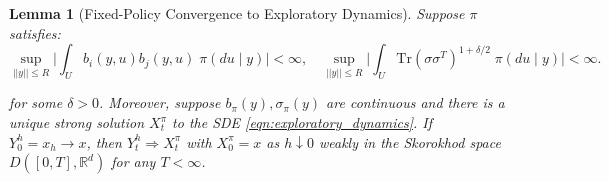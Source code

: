 \documentclass[11pt,oneside,reqno]{article}
\theoremstyle{plain}
\newtheorem{lemma}[theorem]{Lemma}
\theoremstyle{definition}
\numberwithin{equation}{section}
\renewcommand{\leq}{\leqslant}
\newcommand{\R}{\mathbb{R}}
\begin{document}
\begin{lemma}[Fixed-Policy Convergence to Exploratory Dynamics]
	Suppose $\pi$ satisfies:
	\[\sup_{||y|| \leq R} \bigg| \int_U b_i(y, u) b_j(y,u) \; \pi(du \mid y) \bigg| < \infty, \quad \sup_{||y|| \leq R} \bigg|\int_U \mathrm{Tr}(\sigma\sigma^T)^{1+\delta/2} \; \pi(du \mid y) \bigg| < \infty.\]

	\noindent for some $\delta > 0$. Moreover, suppose $b_\pi(y), \sigma_\pi(y)$ are continuous 
	 and there is a unique strong solution $X^\pi_t$ to the SDE 
	\eqref{eqn:exploratory_dynamics}. If $Y^h_0 = x_h \to x$, then $Y^h_t \Rightarrow X^\pi_t$ with $X^\pi_0 = x$ as 
	$h \downarrow 0$ weakly in the Skorokhod space $D([0,T], \R^d)$ for any $T < \infty$.

	\label{lem:convergence_fixed_policy_to_exploratory_dynamics}
\end{lemma}
\end{document}
